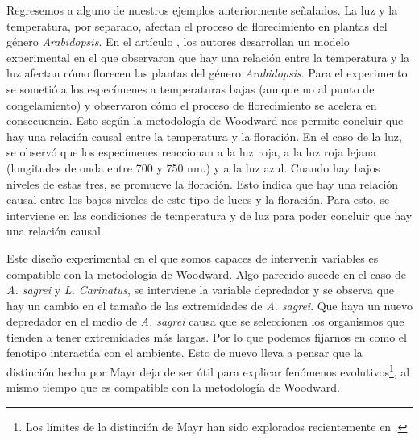 Regresemos a alguno de nuestros ejemplos anteriormente señalados. La luz y la temperatura, por separado,  afectan el proceso de florecimiento en plantas del género \emph{Arabidopsis}. En el artículo \cite{AusinEnviro}, los autores desarrollan un modelo experimental en el que observaron que hay una relación entre la temperatura y la luz afectan cómo florecen las plantas del género \emph{Arabidopsis}. Para el experimento se sometió a los especímenes a temperaturas bajas (aunque no al punto de congelamiento) y observaron cómo el proceso de florecimiento se acelera en consecuencia. Esto según la metodología de Woodward nos permite concluir que hay una relación causal entre la temperatura y la floración. En el caso de la luz, se observó que los especímenes reaccionan a la luz roja, a la luz roja lejana (longitudes de onda entre 700 y 750 nm.) y a la luz azul. Cuando hay bajos niveles de estas tres, se promueve la floración. Esto indica que hay una relación causal entre los bajos niveles de este tipo de luces y la floración. Para esto, se interviene en las condiciones de temperatura y de luz para poder concluir que hay una relación causal.

\begin{center}
\end{center}

Este diseño experimental en el que somos capaces de intervenir variables es compatible con la metodología de Woodward. Algo parecido sucede en el caso de \emph{A. sagrei} y \emph{L. Carinatus}, se interviene la variable depredador y se observa que hay un cambio en el tamaño de las extremidades de \emph{A. sagrei}. Que haya un nuevo depredador en el medio de \emph{A. sagrei} causa que se seleccionen los organismos que tienden a tener extremidades más largas. Por lo que podemos fijarnos en como el fenotipo interactúa con el ambiente. Esto de nuevo lleva a pensar que la distinción hecha por Mayr deja de ser útil para explicar fenómenos evolutivos\footnote{Los límites de la distinción de Mayr han sido explorados recientemente en \cite{Uller2020, Dayan2020, Laland2011}.}, al mismo tiempo que es compatible con la metodología de Woodward.

